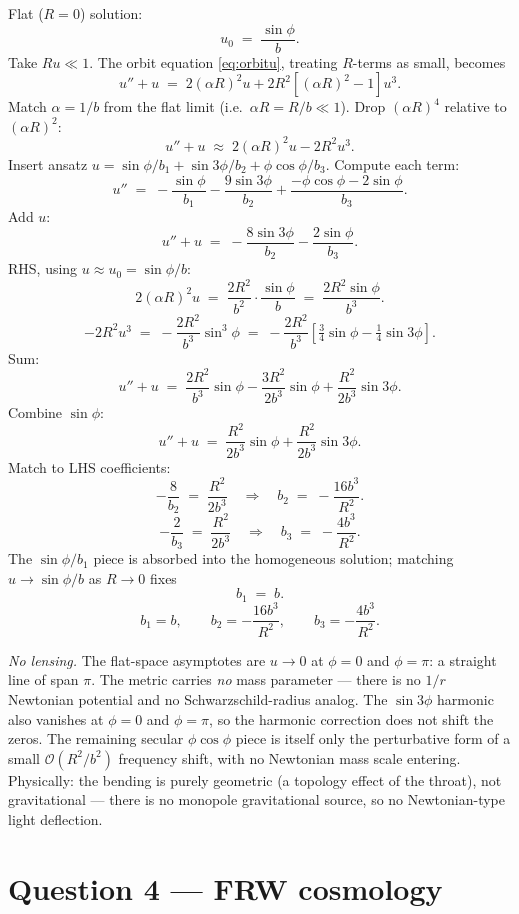 \documentclass[11pt]{article}
\begin{document}
Flat ($R=0$) solution:
\[
u_0 \;=\; \frac{\sin\phi}{b}.
\]
Take $Ru\ll 1$. The orbit equation \eqref{eq:orbitu}, treating $R$-terms as small, becomes
\[
u'' + u \;=\; 2(\alpha R)^2 u + 2R^2[(\alpha R)^2-1]u^3.
\]
Match $\alpha=1/b$ from the flat limit (i.e.\ $\alpha R=R/b\ll 1$). Drop $(\alpha R)^4$ relative to $(\alpha R)^2$:
\[
u'' + u \;\approx\; 2(\alpha R)^2 u - 2R^2 u^3.
\]
Insert ansatz $u=\sin\phi/b_1+\sin 3\phi/b_2+\phi\cos\phi/b_3$. Compute each term:
\[
u'' \;=\; -\frac{\sin\phi}{b_1} - \frac{9\sin 3\phi}{b_2} + \frac{-\phi\cos\phi - 2\sin\phi}{b_3}.
\]
Add $u$:
\[
u'' + u \;=\; -\frac{8\sin 3\phi}{b_2} - \frac{2\sin\phi}{b_3}.
\]
RHS, using $u\approx u_0=\sin\phi/b$:
\[
2(\alpha R)^2 u \;=\; \frac{2R^2}{b^2}\cdot\frac{\sin\phi}{b} \;=\; \frac{2R^2\sin\phi}{b^3}.
\]
\[
-2R^2 u^3 \;=\; -\frac{2R^2}{b^3}\sin^3\phi \;=\; -\frac{2R^2}{b^3}\!\left[\tfrac34\sin\phi - \tfrac14\sin 3\phi\right].
\]
Sum:
\[
u''+u \;=\; \frac{2R^2}{b^3}\sin\phi - \frac{3R^2}{2b^3}\sin\phi + \frac{R^2}{2b^3}\sin 3\phi.
\]
Combine $\sin\phi$:
\[
u''+u \;=\; \frac{R^2}{2b^3}\sin\phi + \frac{R^2}{2b^3}\sin 3\phi.
\]
Match to LHS coefficients:
\[
-\frac{8}{b_2} \;=\; \frac{R^2}{2b^3}\quad\Rightarrow\quad b_2 \;=\; -\frac{16 b^3}{R^2}.
\]
\[
-\frac{2}{b_3} \;=\; \frac{R^2}{2b^3}\quad\Rightarrow\quad b_3 \;=\; -\frac{4 b^3}{R^2}.
\]
The $\sin\phi/b_1$ piece is absorbed into the homogeneous solution; matching $u\to\sin\phi/b$ as $R\to 0$ fixes
\[
b_1 \;=\; b.
\]
\begin{equation}
\boxed{\;b_1=b,\qquad b_2=-\frac{16 b^3}{R^2},\qquad b_3=-\frac{4 b^3}{R^2}.\;}
\label{eq:bcoefs}
\end{equation}

\textit{No lensing.} The flat-space asymptotes are $u\to 0$ at $\phi=0$ and $\phi=\pi$: a straight line of span $\pi$. The metric carries \emph{no} mass parameter --- there is no $1/r$ Newtonian potential and no Schwarzschild-radius analog. The $\sin 3\phi$ harmonic also vanishes at $\phi=0$ and $\phi=\pi$, so the harmonic correction does not shift the zeros. The remaining secular $\phi\cos\phi$ piece is itself only the perturbative form of a small $\mathcal O(R^2/b^2)$ frequency shift, with no Newtonian mass scale entering. Physically: the bending is purely geometric (a topology effect of the throat), not gravitational --- there is no monopole gravitational source, so no Newtonian-type light deflection.

\section*{Question 4 --- FRW cosmology}
\end{document}
